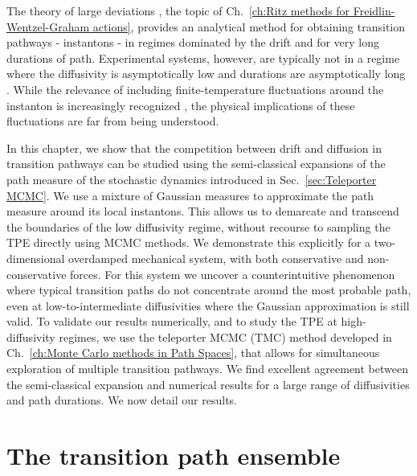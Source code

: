 The theory of large deviations \citep{ventselSMALLRANDOMPERTURBATIONS1970,stratonovichMarkovMethodsTheory1989,grahamMacroscopicPotentialsBifurcations1989,arnoldStochasticDifferentialEquations1974}, the topic of Ch.~\ref{ch:Ritz methods for Freidlin-Wentzel-Graham actions},
provides an analytical method for obtaining transition pathways -
instantons - in regimes dominated by the drift and for very long durations
of path. Experimental systems, however, are typically not in a regime
where the diffusivity is asymptotically low and durations are asymptotically
long \citep{gladrowExperimentalMeasurementRelative2021}. While the
relevance of including finite-temperature fluctuations around the
instanton \citep{gelfandIntegrationFunctionalSpaces1960} is increasingly
recognized \citep{nickelsenNoiseCorrectionLarge2022, corazzaNormalizedGaussianPath2020b, luGaussianApproximationsTransition2017a},
the physical implications of these fluctuations are far from being
understood.

In this chapter, we show that the competition between drift and diffusion
in transition pathways can be studied using the semi-classical expansions
of the path measure of the stochastic dynamics introduced in Sec.~\ref{sec:Teleporter MCMC}. We use a mixture of
Gaussian measures to approximate the path measure around its local
instantons. This allows us to demarcate and transcend the boundaries
of the low diffusivity regime, without recourse to sampling the TPE directly using MCMC methods. We demonstrate this explicitly for
a two-dimensional overdamped mechanical system, with both conservative
and non-conservative forces. For this system we uncover a counterintuitive
phenomenon where typical transition paths do not concentrate around
the most probable path, even at low-to-intermediate diffusivities
where the Gaussian approximation is still valid. To validate our results
numerically, and to study the TPE at high-diffusivity regimes, we use the teleporter MCMC (TMC) method developed in Ch.~\ref{ch:Monte Carlo methods in Path Spaces},
that allows for simultaneous exploration of multiple transition pathways. We
find excellent agreement between the semi-classical expansion and
numerical results for a large range of diffusivities and path durations.
We now detail our results.

\section{The transition path ensemble}


